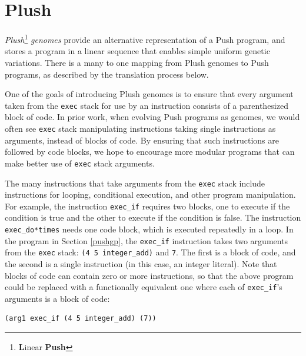\documentclass[graybox]{svmult}
\begin{document}
\section{Plush}
\textit{Plush}\footnote{\textbf{L}inear \textbf{Push}} \textit{genomes} provide
an alternative representation of a Push program, and stores a program in a linear sequence that enables simple uniform genetic variations. There is a many to one mapping from Plush genomes to Push programs, as described by the translation process below.

One of the goals of introducing Plush genomes is to ensure that every argument taken from the \texttt{exec} stack for use by an instruction consists of a parenthesized block of code.
In prior work, when evolving Push programs as genomes, we would often see \texttt{exec} stack manipulating instructions taking single instructions as arguments, instead of blocks of code. By ensuring that such instructions are followed by code blocks, we hope to encourage more modular programs that can make better use of \texttt{exec} stack arguments.

The many instructions that take arguments from the \texttt{exec} stack include instructions for looping, conditional execution, and other program manipulation.
For example, the instruction
\texttt{exec\_if} requires two blocks, one to execute if the condition is true and the other to execute if the condition is false. The instruction \texttt{exec\_do*times} needs one code block, which is executed repeatedly in a loop.
In the program in Section \ref{pushgp}, the \texttt{exec\_if} instruction takes two arguments from the \texttt{exec} stack: \texttt{(4 5 integer\_add)} and \texttt{7}. The first is a block of code, and the second is a single instruction (in this case, an integer literal).
Note that blocks of code can contain zero or more instructions, so that the above program could be replaced with a functionally equivalent one where each of \texttt{exec\_if}'s arguments is a block of code:
\begin{verbatim}
(arg1 exec_if (4 5 integer_add) (7))
\end{verbatim}





\end{document}
